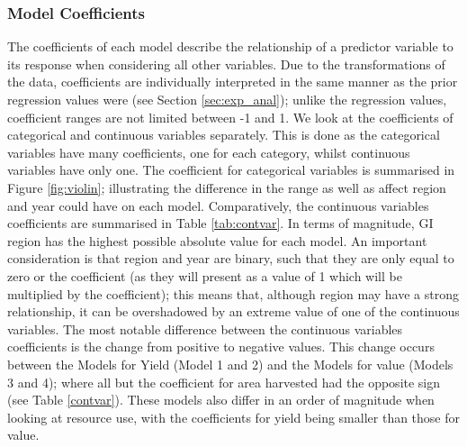 \documentclass[review,12pt,authoryear]{elsarticle}
\begin{document}
\begin{linenumbers}
\subsubsection{Model Coefficients}
%
The coefficients of each model describe the relationship of a predictor variable to its response when considering all other variables. Due to the transformations of the data, coefficients are individually interpreted in the same manner as the prior regression values were (see Section \ref{sec:exp_anal}); unlike the regression values,  coefficient ranges are not limited between -1 and 1.
\newline
We look at the coefficients of categorical and continuous variables separately. This is done as the categorical variables have many coefficients, one for each category, whilst continuous variables have only one. The coefficient for categorical variables is summarised in Figure \ref{fig:violin}; illustrating the difference in the range as well as affect region and year could have on each model. Comparatively, the continuous variables coefficients are summarised in Table \ref{tab:contvar}.
In terms of magnitude, GI region has the highest possible absolute value for each model. An important consideration is that region and year are binary, such that they are only equal to zero or the coefficient (as they will present as a value of 1 which will be multiplied by the coefficient); this means that, although region may have a strong relationship, it can be overshadowed by an extreme value of one of the continuous variables. The most notable difference between the continuous variables coefficients is the change from positive to negative values. This change occurs between the Models for Yield (Model 1 and 2) and the Models for value (Models 3 and 4); where all but the coefficient for area harvested had the opposite sign (see Table \ref{contvar}). These models also differ in an order of magnitude when looking at resource use, with the coefficients for yield being smaller than those for value. 
%
%
%

\end{linenumbers}
\end{document}
